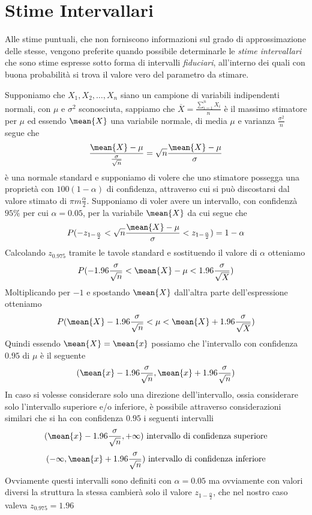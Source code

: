 \documentclass[a4paper,12pt, oneside]{book}
\begin{document}
\section{Stime Intervallari}
Alle stime puntuali, che non forniscono informazioni sul grado di approssimazione delle stesse, vengono preferite quando possibile
determinarle le \emph{stime intervallari} che sono stime espresse sotto forma di intervalli \emph{fiduciari}, 
all'interno dei quali con buona probabilità si trova il valore vero del parametro da stimare.\newline

Supponiamo che $X_1, X_2, \dots, X_n$ siano un campione di variabili indipendenti normali, con $\mu$ e $\sigma^2$
sconosciuta, sappiamo che $\overline{X} = \frac{\sum _{i = 1}^n X_i}{n}$ è il massimo stimatore per $\mu$ ed essendo
$\mean{X}$ una variabile normale, di media $\mu$ e varianza $\frac{\sigma^2}{n}$ segue che
\[ \frac{\mean{X} - \mu}{\frac{\sigma}{\sqrt{n}}} = \sqrt{n} \frac{\mean{X} - \mu}{\sigma} \]
è una normale standard  e supponiamo di volere che uno stimatore possegga una proprietà con $100(1 - \alpha)$ di
confidenza, attraverso cui si può discostarsi dal valore stimato di $\pi m \frac{\alpha}{2}$.\newline
Supponiamo di voler avere un intervallo, con confidenzà $95\%$ per cui $\alpha = 0.05$, per la variabile $\mean{X}$ 
da cui segue che
\[ P(-z_{1 - \frac{\alpha}{2}} < \sqrt{n} \frac{\mean{X} - \mu}{\sigma} < z_{1 - \frac{\alpha}{2}}) = 1 - \alpha \]
Calcolando $z_{0.975}$ tramite le tavole standard e sostituendo il valore di $\alpha$ otteniamo
\[ P(-1.96 \frac{\sigma}{\sqrt{n}} < \mean{X} - \mu < 1.96 \frac{\sigma}{\sqrt{X}} ) \]
Moltiplicando per $-1$ e spostando $\mean{X}$ dall'altra parte dell'espressione otteniamo
\[ P(\mean{X} - 1.96 \frac{\sigma}{\sqrt{n}} < \mu < \mean{X} + 1.96 \frac{\sigma}{\sqrt{X}} ) \]
Quindi essendo $\mean{X} = \mean{x}$ possiamo che l'intervallo con confidenza $0.95$ di $\mu$ è il seguente
\[ (\mean{x} - 1.96 \frac{\sigma}{\sqrt{n}}, \mean{x} + 1.96 \frac{\sigma}{\sqrt{n}}) \]
In caso si volesse considerare solo una direzione dell'intervallo, ossia considerare solo l'intervallo superiore e/o
inferiore, è possibile attraverso considerazioni similari che si ha con confidenza $0.95$ i seguenti intervalli
\[ (\mean{x} - 1.96 \frac{\sigma}{\sqrt{n}}, +\infty) \mbox { intervallo di confidenza superiore} \]
\[ (-\infty, \mean{x} + 1.96 \frac{\sigma}{\sqrt{n}}) \mbox { intervallo di confidenza inferiore} \]
Ovviamente questi intervalli sono definiti con $\alpha = 0.05$ ma ovviamente con valori diversi la struttura la stessa 
cambierà solo il valore $z_{1 - \frac{\alpha}{2}}$, che nel nostro caso valeva $z_{0.975} = 1.96$
\end{document}
